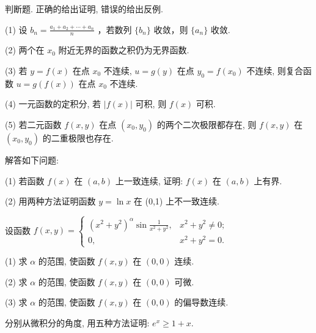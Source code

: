 判断题. 正确的给出证明, 错误的给出反例.\par
(1) 设  $b_{n}=\frac{a_{1}+a_{2}+\cdots+a_{n}}{n}$ ，若数列  $\{b_{n}\}$  收敛，则  $\{a_{n}\}$  收敛.\par
(2) 两个在 $x_0$ 附近无界的函数之积仍为无界函数.\par
(3) 若 $y = f(x)$ 在点 $x_0$ 不连续, $u = g(y)$ 在点 $y_0 = f(x_0)$ 不连续, 则复合函数 $u = g(f(x))$ 在点 $x_0$ 不连续.\par
(4) 一元函数的定积分, 若 $|f(x)|$ 可积, 则 $f(x)$ 可积.\par
(5) 若二元函数 $f(x, y)$ 在点 $(x_0, y_0)$ 的两个二次极限都存在, 则 $f(x, y)$ 在 $(x_0, y_0)$ 的二重极限也存在.\par
解答如下问题:\par
(1) 若函数 $f(x)$ 在 $(a, b)$ 上一致连续, 证明: $f(x)$ 在 $(a, b)$ 上有界.\par
(2) 用两种方法证明函数 $y = \ln x$ 在 (0,1) 上不一致连续.\par
设函数 $f(x, y) = \begin{cases} (x^2 + y^2)^{\alpha} \sin \frac{1}{x^2 + y^2}, & x^2 + y^2 \neq 0; \\ 0, & x^2 + y^2 = 0. \end{cases}$\par
(1) 求 $\alpha$ 的范围, 使函数 $f(x, y)$ 在 $(0, 0)$ 连续.\par
(2) 求 $\alpha$ 的范围, 使函数 $f(x, y)$ 在 $(0, 0)$ 可微.\par
(3) 求 $\alpha$ 的范围, 使函数 $f(x, y)$ 在 $(0,0)$ 的偏导数连续.\par
分别从微积分的角度, 用五种方法证明: $e^x \geq 1 + x$.\par
